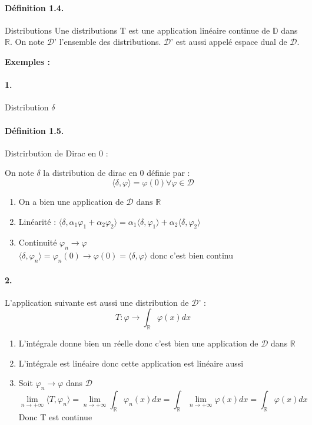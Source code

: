 \documentclass[12pt,a4paper]{report}
\newcommand{\Ens}[1]{\ensuremath{\mathbb{#1}}}
\newcommand{\ens}[1]{\ensuremath{\mathbb{#1}}}
\newcommand{\D}{\ensuremath{\mathcal{D}}}
\begin{document}
\paragraph{Définition 1.4.} Distributions
Une distributions T est une application linéaire continue de \(\mathbb{D}\) dans \(\mathbb{R}\).
On note \D' l'ensemble des distributions. \D' est aussi appelé espace dual de \D.

\textbf{Exemples :}

\paragraph{1.} Distribution \(\delta\)
\paragraph{Définition 1.5.} Distrirbution de Dirac en 0 :

On note \(\delta\) la distribution de dirac en 0 définie par :
\[
	\langle \delta, \varphi \rangle = \varphi(0) \forall \varphi \in \D
\]

\begin{enumerate}
	\item On a bien une application de \(\D \text{ dans } \mathbb{R}\)
	\item Linéarité : \(\langle \delta, \alpha_1 \varphi_1 + 	\alpha_2 \varphi_2 \rangle = \alpha_1 \langle \delta, \varphi_1 \rangle + \alpha_2 \langle \delta, \varphi_2 \rangle\)
	\item Continuité \(\varphi_n \rightarrow \varphi\)\\
	\(\langle \delta, \varphi_n \rangle = \varphi_n (0) \rightarrow \varphi(0) = \langle \delta, \varphi \rangle\) donc c'est bien continu 
\end{enumerate}

\paragraph{2.} L'application suivante est aussi une distribution de \D' :
\[
	T : \varphi \rightarrow \int_{\Ens{R}} \varphi(x) dx
\]
\begin{enumerate}
	\item L'intégrale donne bien un réelle donc c'est bien une application de \(\D\) dans \(\Ens{R}\)
	\item L'intégrale est linéaire donc cette application est linéaire aussi
	\item Soit \(\varphi_n \rightarrow \varphi\) dans \D
	\[
		\lim_{n \rightarrow +\infty} \langle T, \varphi_n \rangle = \lim_{n \rightarrow +\infty} \int_{\ens{R}} \varphi_n (x) dx = \int_{\ens{R}} \lim_{n \rightarrow +\infty} \varphi (x) dx = \int_{\ens{R}} \varphi(x) dx
	\]
	Donc T est continue
\end{enumerate}
\end{document}
